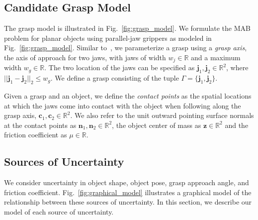 \documentclass[10pt, conference]{ieeeconf}      %
\newcommand{\bc}{\mathbf{c}}
\newcommand{\bn}{\mathbf{n}}
\newcommand{\bz}{\mathbf{z}}
\begin{document}
\subsection{Candidate Grasp Model}
The grasp model is illustrated in Fig.~\ref{fig:grasp_model}. We formulate the MAB problem for planar objects using parallel-jaw grippers as modeled in Fig.~\ref{fig:grasp_model}. Similar to~\cite{mahler2015gp}, we parameterize a grasp using a {\it grasp axis}, the axis of approach for two jaws,  with jaws of width $w_j \in \mathbb{R}$ and a maximum width $w_g \in \mathbb{R}$. The two location of the jaws can be specified as $\mathbf{j}_1,\mathbf{j}_2 \in \mathbb{R}^2$, where $||\mathbf{j}_1 - \mathbf{j}_2||_2 \leq w_g$. We define a grasp consisting of the tuple $\Gamma = \lbrace \mathbf{j}_1, \mathbf{j}_2 \rbrace$. 


Given a grasp and an object, we define the {\it contact points} as the spatial locations at which the jaws come into contact with the object when following along the grasp axis, $\bc_1, \bc_2 \in \mathbb{R}^2$.
We also refer to the unit outward pointing surface normals at the contact points as $\bn_1, \bn_2 \in \mathbb{R}^2$, the object center of mass as $\bz \in \mathbb{R}^2$ and the friction coefficient as $\mu \in \mathbb{R}$.




\subsection{Sources of Uncertainty}
We consider uncertainty in object shape, object pose, grasp approach angle, and friction coefficient.
Fig.~\ref{fig:graphical_model} illustrates a graphical model of the relationship between these sources of uncertainty.
In this section, we describe our model of each source of uncertainty.
\end{document}

